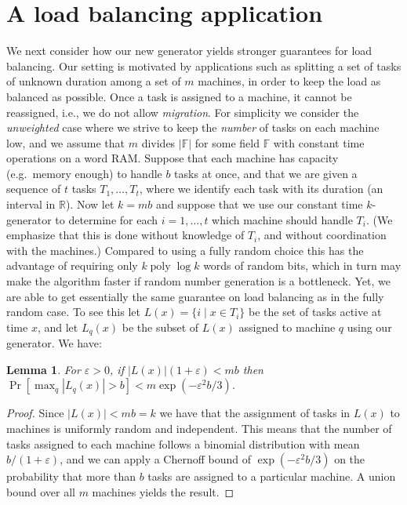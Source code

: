 \documentclass[a4paper,11pt]{article}
\theoremstyle{plain}
\newtheorem{lemma}{Lemma}
\theoremstyle{definition}
\newcommand{\F}{\mathbb{F}}
\newcommand{\R}{\mathbb{R}}
\DeclareMathOperator{\poly}{poly}
\begin{document}
\section{A load balancing application} \label{sec:loadbalancing}
We next consider how our new generator yields stronger guarantees for load balancing.
Our setting is motivated by applications such as splitting a set of tasks of unknown duration among a set of $m$ machines, in order to keep the load as balanced as possible.
Once a task is assigned to a machine, it cannot be reassigned, i.e., we do not allow \emph{migration}.
For simplicity we consider the \emph{unweighted} case where we strive to keep the \emph{number} of tasks on each machine low, and we assume that $m$ divides $|\F|$ for some field $\F$ with constant time operations on a word RAM.
Suppose that each machine has capacity (e.g.~memory enough) to handle $b$ tasks at once, and that we are given a sequence of $t$ tasks $T_1,\dots,T_t$, where we identify each task with its duration (an interval in $\R$).
Now let $k = mb$ and suppose that we use our constant time $k$-generator to determine for each $i=1,\dots,t$ which machine should handle $T_i$.
(We emphasize that this is done without knowledge of $T_i$, and without coordination with the machines.)
Compared to using a fully random choice this has the advantage of requiring only $k\poly\log k$ words of random bits, which in turn may make the algorithm faster if random number generation is a bottleneck.
Yet, we are able to get essentially the same guarantee on load balancing as in the fully random case.
To see this let $L(x) = \{ i \; | \; x\in T_i\}$ be the set of tasks active at time $x$, and let $L_q(x)$ be the subset of $L(x)$ assigned to machine $q$ using our generator.
We have:
\begin{lemma}\label{lem:error}
For $\varepsilon > 0$, if $|L(x)| (1+\varepsilon) < mb$ then
$\Pr[\max_q |L_q(x)| > b] < m \exp(-\varepsilon^2 b / 3)$.
\end{lemma}
\begin{proof}
Since $|L(x)| < mb = k$ we have that the assignment of tasks in $L(x)$ to machines is uniformly random and independent.
This means that the number of tasks assigned to each machine follows a binomial distribution with mean $b/(1+\varepsilon)$, and we can apply a Chernoff bound of $\exp(-\varepsilon^2 b / 3)$ on the probability that more than $b$ tasks are assigned to a particular machine.
A union bound over all $m$ machines yields the result.
\end{proof}
\end{document}
